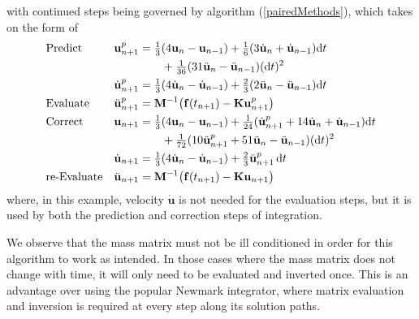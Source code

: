 with continued steps being governed by algorithm (\ref{pairedMethods}), which takes on the form of
\begin{subequations}
    \notag
    \begin{align}
    \mbox{} & \text{Predict} &
    \mathbf{u}_{n+1}^p & = \tfrac{1}{3} (
    4 \mathbf{u}_n - \mathbf{u}_{n-1} ) + 
    \tfrac{1}{6} ( 3 \dot{\mathbf{u}}_n + 
    \dot{\mathbf{u}}_{n-1} ) \mathrm{d}t \\ & & & \qquad + 
    \tfrac{1}{36} ( 31 \ddot{\mathbf{u}}_n - 
    \ddot{\mathbf{u}}_{n-1} ) ( \mathrm{d}t )^2 \\
    \mbox{} & &
    \dot{\mathbf{u}}_{n+1}^p & = \tfrac{1}{3} 
    ( 4 \dot{\mathbf{u}}_n - \dot{\mathbf{u}}_{n-1} ) + 
    \tfrac{2}{3} ( 2 \ddot{\mathbf{u}}_n - \ddot{\mathbf{u}}_{n-1} ) \mathrm{d}t \\
    \mbox{} & \text{Evaluate} &
    \ddot{\mathbf{u}}^p_{n+1} & = \mathbf{M}^{-1} \bigl( \mathbf{f}(t_{n+1} ) - 
    \mathbf{K} \mathbf{u}_{n+1}^p \bigr) \\
    \mbox{} & \text{Correct} & 
    \mathbf{u}_{n+1} & = \tfrac{1}{3} (
    4  \mathbf{u}_n - \mathbf{u}_{n-1} ) +
    \tfrac{1}{24} ( \dot{\mathbf{u}}^p_{n+1} +
    14 \dot{\mathbf{u}}_n + \dot{\mathbf{u}}_{n-1} ) \mathrm{d}t  \\
    \mbox{} & & & \qquad +
    \tfrac{1}{72} ( 10 \ddot{\mathbf{u}}^p_{n+1} + 
    51 \ddot{\mathbf{u}}_n - \ddot{\mathbf{u}}_{n-1} ) ( \mathrm{d}t )^2 \\ 
    \mbox{} & &
    \dot{\mathbf{u}}_{n+1} & = \tfrac{1}{3} 
    ( 4 \dot{\mathbf{u}}_n - \dot{\mathbf{u}}_{n-1} ) + 
    \tfrac{2}{3} \ddot{\mathbf{u}}^p_{n+1} \, \mathrm{d}t \\
    \mbox{} & \text{re-Evaluate} & 
    \ddot{\mathbf{u}}_{n+1} & = \mathbf{M}^{-1} \bigl( \mathbf{f}(t_{n+1} ) - 
    \mathbf{K} \mathbf{u}_{n+1} \bigr) 
    \end{align}
\end{subequations}
where, in this example, velocity $\dot{\mathbf{u}}$ is not needed for the evaluation steps, but it is used by both the prediction and correction steps of integration.

We observe that the mass matrix must not be ill conditioned in order for this algorithm to work as intended.  In those cases where the mass matrix does not change with time, it will only need to be evaluated and inverted once.  This is an advantage over using the popular Newmark \cite{Newmark59} integrator, where matrix evaluation and inversion is required at every step along its solution paths.

